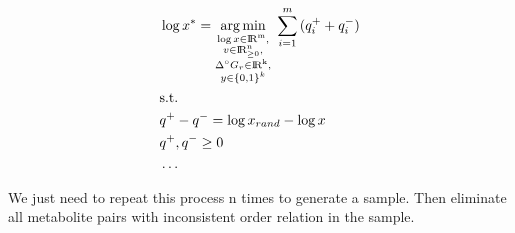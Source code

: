 \documentclass[12pt]{article}
\DeclareMathOperator*{\argmin}{arg\,min}
\begin{document}
  \begin{align}
    \begin{aligned}
      \label{eq:10}
      &\log x^* = \argmin_{\substack{ \log{x} \in \rm I\!R^m, \\
                            v \in \rm I\!R^n_{\geq 0}, \\
                            \Delta^{\circ} G_{r} \in \rm I\!R^k, \\
                            y \in \{0, 1\}^k }} \; \sum_{i=1}^m {(q^+_i + q^-_i)}
      \\
      &\mathrm{s.t.}
      \\
      &q^+ - q^- = \log{x_{rand}} - \log{x}
      \\
      &q^+, q^- \geq 0
      \\
      &\dots
    \end{aligned}
  \end{align}






  We just need to repeat this process n times to generate a sample. Then eliminate all metabolite pairs with inconsistent order relation in the sample.





  
\end{document}
